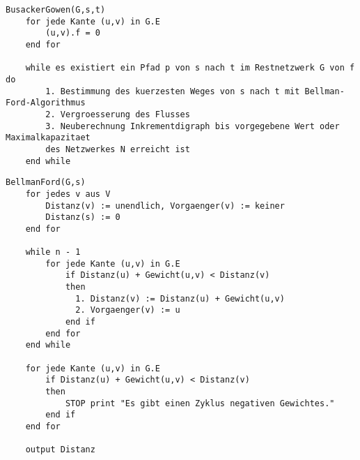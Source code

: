 \begin{lstlisting}
BusackerGowen(G,s,t)
    for jede Kante (u,v) in G.E 
        (u,v).f = 0
    end for
    
    while es existiert ein Pfad p von s nach t im Restnetzwerk G von f do
        1. Bestimmung des kuerzesten Weges von s nach t mit Bellman-Ford-Algorithmus
        2. Vergroesserung des Flusses
        3. Neuberechnung Inkrementdigraph bis vorgegebene Wert oder Maximalkapazitaet
        des Netzwerkes N erreicht ist
    end while
\end{lstlisting}

\begin{lstlisting}
BellmanFord(G,s)
    for jedes v aus V                   
        Distanz(v) := unendlich, Vorgaenger(v) := keiner
        Distanz(s) := 0
    end for
    
    while n - 1               
        for jede Kante (u,v) in G.E
            if Distanz(u) + Gewicht(u,v) < Distanz(v)
            then
              1. Distanz(v) := Distanz(u) + Gewicht(u,v)
              2. Vorgaenger(v) := u
            end if
        end for
    end while
        
    for jede Kante (u,v) in G.E                
        if Distanz(u) + Gewicht(u,v) < Distanz(v)
        then
            STOP print "Es gibt einen Zyklus negativen Gewichtes."
        end if
    end for

    output Distanz
\end{lstlisting}

